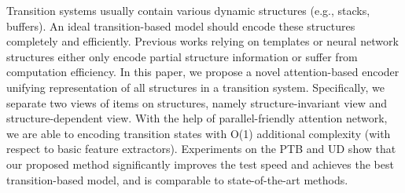 Transition systems usually contain various dynamic structures (e.g., stacks, buffers). An ideal transition-based model should encode these structures completely and efficiently. Previous works relying on templates or neural network structures either only encode partial structure information or suffer from computation efficiency. In this paper, we propose a novel attention-based encoder unifying representation of all structures in a transition system. Specifically, we separate two views of items on structures, namely structure-invariant view and structure-dependent view. With the help of parallel-friendly attention network, we are able to encoding transition states with O(1) additional complexity (with respect to basic feature extractors). Experiments on the PTB and UD show that our proposed method significantly improves the test speed and achieves the best transition-based model, and is comparable to state-of-the-art methods.
